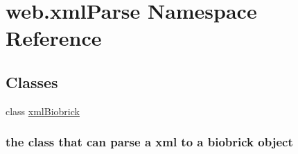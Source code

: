 \hypertarget{namespaceweb_1_1xml_parse}{\section{web.\-xml\-Parse Namespace Reference}
\label{namespaceweb_1_1xml_parse}
}
\subsection*{Classes}
\begin{DoxyCompactItemize}
\item 
class \hyperlink{classweb_1_1xml_parse_1_1xml_biobrick}{xml\-Biobrick}
\begin{DoxyCompactList}\small\item\em \subsubsection*{the class that can parse a xml to a biobrick object }\end{DoxyCompactList}\end{DoxyCompactItemize}

